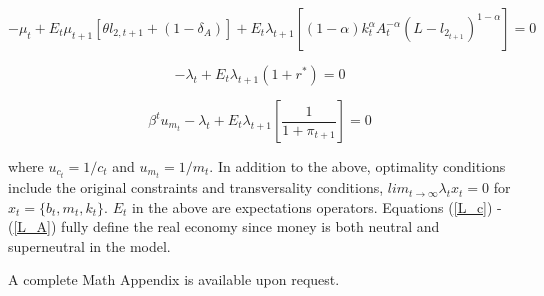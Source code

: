 \documentclass{OUP-EJ}
\begin{document}
\begin{equation}
    \label{L_A}
    -\mu_t + E_t \mu_{t+1} [\theta l_{2,t+1} +(1- \delta_A )]+E_t \lambda_{t+1}[(1-\alpha) k_t^{\alpha}A_t^{-\alpha}(L-l_{2_{t+1}})^{1-\alpha}]=0
\end{equation}

\begin{equation}
    \label{L_b}
    -\lambda_t + E_t \lambda_{t+1} (1+r^*) = 0
\end{equation}

\begin{equation}
    \label{L_m}
    \beta^t u_{m_t} - \lambda_t +E_t \lambda_{t+1} \left[\frac{1}{1+\pi_{t+1}}\right] = 0
\end{equation}

where $u_{c_t} = {1}/{c_t}$ and $u_{m_t} = {1}/{m_t}$.  In addition to the above, optimality conditions include the original constraints and transversality conditions, $ lim_{t\rightarrow \infty} \lambda_t x_t = 0$ for $x_t = \{b_t, m_t, k_t\} $. $E_t$ in the above are expectations operators. Equations (\ref{L_c}) - (\ref{L_A}) fully define the real economy since money is both neutral and superneutral in the model. 

A complete Math Appendix is available upon request.



\begin{table}[p]
    \centering
    \caption{Policy: Baseline}
\end{table}
\end{document}
